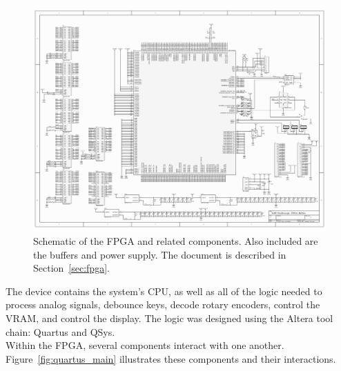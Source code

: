 \documentclass[titlepage]{scrartcl}
\begin{document}
	\begin{figure}[h!]
	\vspace{-2cm}
	\centerline{\includegraphics[width=26cm, angle=90, origin=c]{img/fpga_sch.pdf}}
                	\caption{Schematic of the FPGA and related components. Also included are the buffers and power supply. The document is described in Section~\ref{sec:fpga}.}
               	\label{fig:fpga_schematic}
	\end{figure}

	The device contains the system's CPU, as well as all of the logic needed to process analog signals, debounce keys, decode rotary encoders, control the VRAM, and control the display. The logic was designed using the Altera tool chain: Quartus and QSys.\\

	Within the FPGA, several components interact with one another. Figure~\ref{fig:quartus_main} illustrates these components and their interactions.\\
\end{document}
